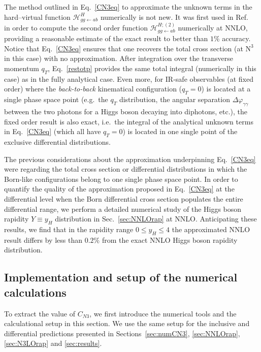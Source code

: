 \documentclass[12pt]{article}
\DeclareRobustCommand{\qt}{\ensuremath{q_T}\xspace}
\DeclareRobustCommand{\cH}{\ensuremath{\mathcal{H}}}
\DeclareRobustCommand{\LO}{\text{LO}\xspace}
\DeclareRobustCommand{\N}[1]{\ensuremath{\text{N}^{#1}}} %
\begin{document}
The method outlined in Eq.~\eqref{CN3eq} to approximate the unknown terms in the hard--virtual function $\cH^H_{gg\gets ab}$ numerically is not new. It was first used in Ref.~\cite{Bozzi:2005wk} in order to compute the second order function $\cH^{H;(2)}_{gg\gets ab}$ numerically at NNLO, providing a reasonable estimate of the exact result to better than $1\%$ accuracy. Notice that Eq.~\eqref{CN3eq} ensures that one recovers the total cross section (at \N3\LO in this case) with no approximation. After integration over the transverse momentum $\qt$, Eq.~\eqref{restotp} provides the same total integral (numerically in this case)  as in the fully analytical case. Even more, for IR-safe observables (at fixed order) where the \textit{back-to-back} kinematical configuration ($\qt=0$) is located at a single phase space point (e.g.\ the $\qt$ distribution, the angular separation $\Delta \varphi _{\gamma\gamma}$ between the two photons for a Higgs boson decaying into diphotons, etc.), the fixed order result is also exact, i.e.\ the integral of the analytical unknown terms in Eq.~\eqref{CN3eq} (which all have $\qt=0$) is located in one single point of the exclusive differential distributions. 

The previous considerations about the approximation underpinning Eq.~\eqref{CN3eq} were regarding the total cross section or differential distributions in which the Born-like configurations belong to one single phase space point.
In order to quantify the quality of the approximation proposed in Eq.~\eqref{CN3eq} at the differential level when the Born differential cross section populates the entire differential range, we perform a detailed numerical study of the Higgs boson rapidity $Y \equiv y_{H}$ distribution in Sec.~\ref{sec:NNLOrap} at NNLO. Anticipating these results,  we find that in the rapidity range $0\leq y_{H}\leq 4$ the approximated NNLO result differs by less than $0.2\%$ from the exact NNLO Higgs boson rapidity distribution.

\subsection{Implementation and setup of the numerical calculations}
\label{sec:numsetup}

To extract the value of $C_{N3}$, we first introduce the numerical tools and the calculational setup in this section. We use the same setup for the inclusive and differential predictions presented in Sections~\ref{sec:numCN3}, \ref{sec:NNLOrap}, \ref{sec:N3LOrap} and \ref{sec:results}.
\end{document}
